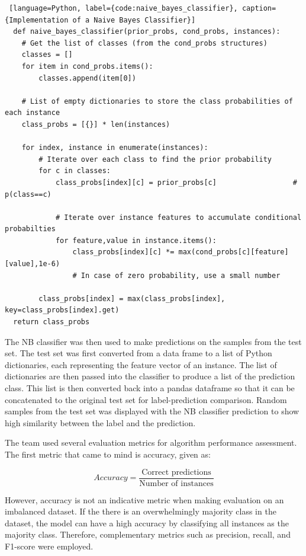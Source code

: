 \documentclass[a4paper]{article}
\begin{document}
\begin{lstlisting} [language=Python, label={code:naive_bayes_classifier}, caption={Implementation of a Naive Bayes Classifier}]
  def naive_bayes_classifier(prior_probs, cond_probs, instances):
    # Get the list of classes (from the cond_probs structures)
    classes = []
    for item in cond_probs.items():
        classes.append(item[0])

    # List of empty dictionaries to store the class probabilities of each instance
    class_probs = [{}] * len(instances)                                        
    
    for index, instance in enumerate(instances):
        # Iterate over each class to find the prior probability 
        for c in classes:
            class_probs[index][c] = prior_probs[c]                  # p(class==c)

            # Iterate over instance features to accumulate conditional probabilties
            for feature,value in instance.items():
                class_probs[index][c] *= max(cond_probs[c][feature][value],1e-6)       
                # In case of zero probability, use a small number
        
        class_probs[index] = max(class_probs[index], key=class_probs[index].get)
  return class_probs
\end{lstlisting}

The NB classifier was then used to make predictions on the samples from the test set. The test set was first converted from a data frame to a list of Python dictionaries, each representing the feature vector of an instance. The list of dictionaries are then passed into the classifier to produce a list of the prediction class. This list is then converted back into a pandas dataframe so that it can be concatenated to the original test set for label-prediction comparison. Random samples from the test set was displayed with the NB classifier prediction to show high similarity between the label and the prediction.

The team used several evaluation metrics for algorithm performance assessment. The first metric that came to mind is accuracy, given as:

\begin{equation}
  Accuracy = \frac{\text{Correct predictions}}{\text{Number of instances}}
\end{equation}

However, accuracy is not an indicative metric when making evaluation on an imbalanced dataset. If the there is an overwhelmingly majority class in the dataset, the model can have a high accuracy by classifying all instances as the majority class. Therefore, complementary metrics such as precision, recall, and F1-score were employed. 
\end{document}
